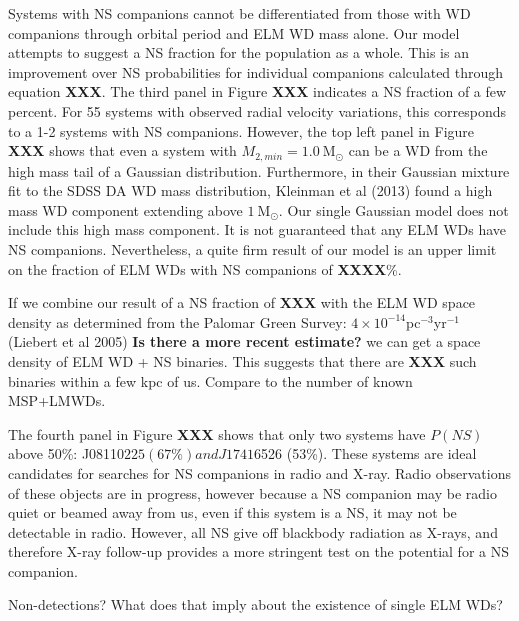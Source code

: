 \documentclass[letterpaper,12pt,preprint]{aastex}
\newcommand{\Msun}{\mathrm{M}_\odot}
\begin{document}
Systems with NS companions cannot be differentiated from those with WD companions through orbital period and ELM WD mass alone. Our model attempts to suggest a NS fraction for the population as a whole. This is an improvement over NS probabilities for individual companions calculated through equation {\bf XXX}. The third panel in Figure {\bf XXX} indicates a NS fraction of a few percent. For 55 systems with observed radial velocity variations, this corresponds to a 1-2 systems with NS companions. However, the top left panel in Figure {\bf XXX} shows that even a system with $M_{2,min}=1.0~\Msun$ can be a WD from the high mass tail of a Gaussian distribution. Furthermore, in their Gaussian mixture fit to the SDSS DA WD mass distribution, Kleinman et al (2013) found a high mass WD component extending above $1~\Msun$. Our single Gaussian model does not include this high mass component. It is not guaranteed that any ELM WDs have NS companions. Nevertheless, a quite firm result of our model is an upper limit on the fraction of ELM WDs with NS companions of {\bf XXXX}\%.


If we combine our result of a NS fraction of {\bf XXX} with the ELM WD space density as determined from the Palomar Green Survey: $4\times10^{-14}$pc$^{-3}$yr$^{-1}$ (Liebert et al 2005) {\bf Is there a more recent estimate?} we can get a space density of ELM WD + NS binaries. This suggests that there are {\bf XXX} such binaries within a few kpc of us. Compare to the number of known MSP+LMWDs.


The fourth panel in Figure {\bf XXX} shows  that only two systems have $P(NS)$ above 50\%: J0811$0225 (67\%) and J1741$6526 (53\%). These systems are ideal candidates for searches for NS companions in radio and X-ray. Radio observations of these objects are in progress, however because a NS companion may be radio quiet or beamed away from us, even if this system is a NS, it may not be detectable in radio. However, all NS give off blackbody radiation as X-rays, and therefore X-ray follow-up provides a more stringent test on the potential for a NS companion.


Non-detections? What does that imply about the existence of single ELM WDs?
\end{document}

